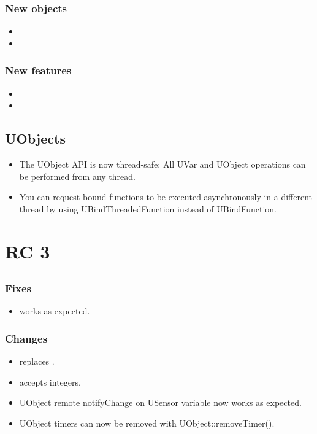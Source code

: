 \subsubsection{New objects}
\begin{itemize}
\item {}
\item {}
\end{itemize}

\subsubsection{New features}
\begin{itemize}
\item {}
\item {}
\end{itemize}

\subsection{UObjects}

\begin{itemize}
\item The UObject API is now thread-safe: All UVar and UObject
  operations can be performed from any thread.
\item You can request bound functions to be executed asynchronously in
  a different thread by using UBindThreadedFunction instead of
  UBindFunction.
\end{itemize}


\section{ RC 3}

\subsection{\us}

\subsubsection{Fixes}
\begin{itemize}
\item {} works as expected.
\end{itemize}

\subsubsection{Changes}
\begin{itemize}
\item {} replaces .
\item {} accepts integers.
\item UObject remote notifyChange on USensor variable now works as expected.
\item UObject timers can now be removed with UObject::removeTimer().
\end{itemize}

